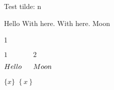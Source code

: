 \documentclass{minimal}
\begin{document}
Test tilde: \tilde n

Hello
\thinspace
\medspace
\thickspace
\bigskip
\hspace{1em}
\hfill
\vspace{1em}
\vfill
With  here.
With  here.
Moon

1 \, \: \; \! \quad {}

$1 \, \: \; \! \quad \qquad 2$

$Hello
\thinspace
\medspace
\thickspace
\bigskip
\hspace{1em}
\hfill
\vspace{1em}
Moon$

$\{x\}$
$\left\{x\right\}$
\end{document}
